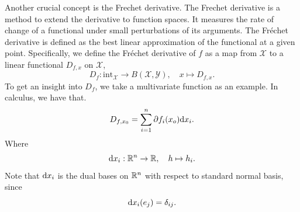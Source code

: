 Another crucial concept is the Frechet derivative. The Frechet derivative is a method to extend the derivative to function spaces. It measures the rate of change of a functional under small perturbations of its arguments. The Fréchet derivative is defined as the best linear approximation of the functional at a given point. Specifically, we define the Fréchet derivative of $f$ as a map from $\mathcal{X}$ to a linear functional $D_{f,x}$ on $\mathcal{X}$,
$$
D_{f}: \mathrm{int}_{\mathcal{X}} \to B(\mathcal{X},\mathcal{Y}), \quad x \mapsto D_{f,x}.
$$
To get an insight into $D_f$, we take a multivariate function as an example. In calculus, we have that. 
$$
D_{f,x_0} = \sum_{i=1}^n \partial f_i (x_o) \mathrm{d} x_i.
$$
%
Where
$$
\mathrm{d} x_i : \mathbb{R}^n \to \mathbb{R}, \quad h \mapsto h_i.
$$
Note that $\mathrm{d} x_i$ is the dual bases on $\mathbb{R}^n$ with respect to standard normal basis, since
$$
\mathrm{d} x_i (e_j) = \delta_{ij}.
$$


